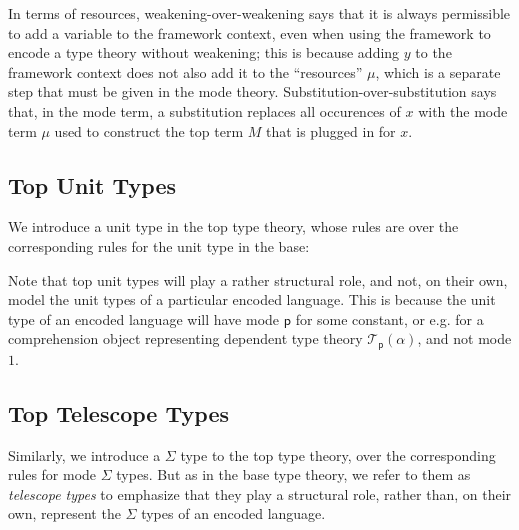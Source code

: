 \documentclass[10pt]{article}
\theoremstyle{definition}
\newcommand{\yields}{\vdash}
\newcommand{\TYPE}{\,\,\mathsf{Type}}
\newcommand\El[2]{\mathcal{T}_{#1}(#2)}
\begin{document}
In terms of resources, weakening-over-weakening says that it is always
permissible to add a variable to the framework context, even when using
the framework to encode a type theory without weakening; this is because
adding $y$ to the framework context does not also add it to the
``resources'' $\mu$, which is a separate step that must be given in the
mode theory.  Substitution-over-substitution says that, in the mode
term, a substitution replaces all occurences of $x$ with the mode term
$\mu$ used to construct the top term $M$ that is plugged in for $x$.

\subsection{Top Unit Types}

We introduce a unit type in the top type theory, whose rules are over
the corresponding rules for the unit type in the base:


Note that top unit types will play a rather structural role, and not, on
their own, model the unit types of a particular encoded language.  This
is because the unit type of an encoded language will have mode
$\mathsf{p}$ for some constant, or e.g. for a comprehension object
representing dependent type theory $\El{\mathsf p}{\alpha}$, and not
mode $1$.  

\subsection{Top Telescope Types}

Similarly, we introduce a $\Sigma$ type to the top type theory, over the
corresponding rules for mode $\Sigma$ types.  But as in the base type
theory, we refer to them as \emph{telescope types} to emphasize that
they play a structural role, rather than, on their own, represent the
$\Sigma$ types of an encoded language.  
\end{document}
